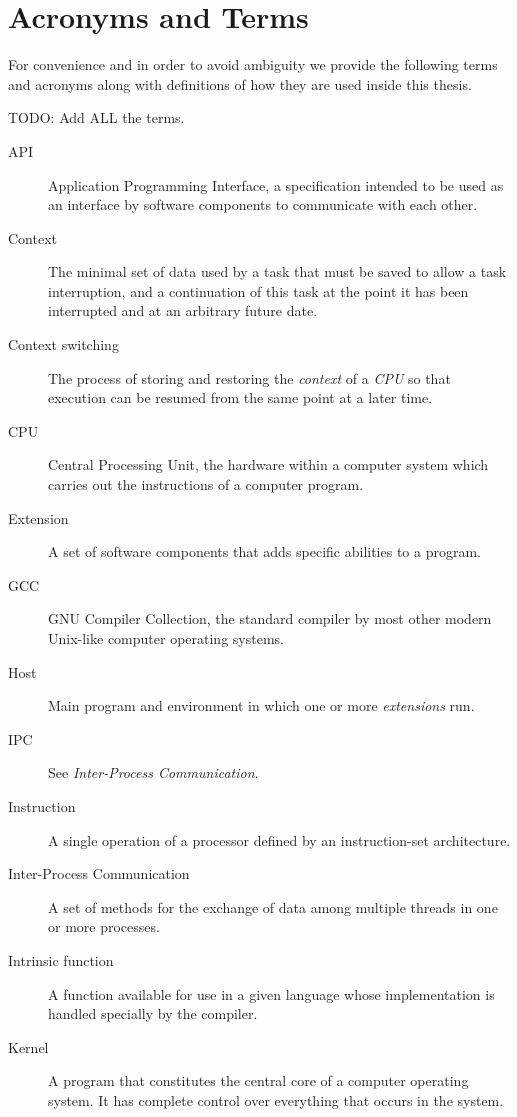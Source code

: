 \chapter {Acronyms and Terms} \label{appA}

For convenience and in order to avoid ambiguity we provide the following terms
and acronyms along with definitions of how they are used inside this thesis.

TODO: Add ALL the terms.

\begin {description}
	\item [API] Application Programming Interface, a specification intended to
		be used as an interface by software components to communicate with each
		other.
	\item [Context] The minimal set of data used by a task that must be saved
		to allow a task interruption, and a continuation of this task at the
		point it has been interrupted and at an arbitrary future date.
	\item [Context switching] The process of storing and restoring the
		\emph{context} of a \emph{CPU} so that execution can be resumed from
		the same point at a later time.
	\item [CPU] Central Processing Unit, the hardware within a computer system
		which carries out the instructions of a computer program.
	\item [Extension] A set of software components that adds specific abilities
		to a program.
	\item [GCC] GNU Compiler Collection, the standard compiler by most other
		modern Unix-like computer operating systems.
	\item [Host] Main program and environment in which one or more
		\emph{extensions} run.
	\item [IPC] See \emph{Inter-Process Communication}.
	\item [Instruction] A single operation of a processor defined by an
		instruction-set architecture.
	\item [Inter-Process Communication] A set of methods for the exchange of
		data among multiple threads in one or more processes.
	\item [Intrinsic function] A function available for use in a given language
		whose implementation is handled specially by the compiler.
	\item [Kernel] A program that constitutes the central core of a computer
		operating system. It has complete control over everything that occurs
		in the system.

\end{description}
